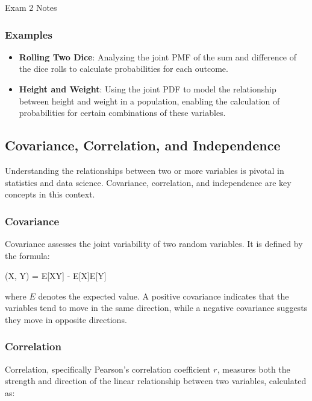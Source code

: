 \begin{examnotes}{Exam 2 Notes}
    \subsubsection*{Examples}
    
    \begin{itemize}
        \item \textbf{Rolling Two Dice}: Analyzing the joint PMF of the sum and difference of the dice rolls to calculate probabilities for each outcome.
        \item \textbf{Height and Weight}: Using the joint PDF to model the relationship between height and weight in a population, enabling the calculation of probabilities for certain combinations 
        of these variables.
    \end{itemize}

    \subsection*{Covariance, Correlation, and Independence}

    Understanding the relationships between two or more variables is pivotal in statistics and data science. Covariance, correlation, and independence are key concepts in this context.
    
    \subsubsection*{Covariance}
    
    Covariance assesses the joint variability of two random variables. It is defined by the formula:
    
    \begin{center}
        \begin{highlightbox}
            (X, Y) = E[XY] - E[X]E[Y]
        \end{highlightbox}
    \end{center}
    where $E$ denotes the expected value. A positive covariance indicates that the variables tend to move in the same direction, while a negative covariance suggests they move in opposite directions.
    
    \subsubsection*{Correlation}
    
    Correlation, specifically Pearson's correlation coefficient $r$, measures both the strength and direction of the linear relationship between two variables, calculated as:
    

\end{examnotes}
